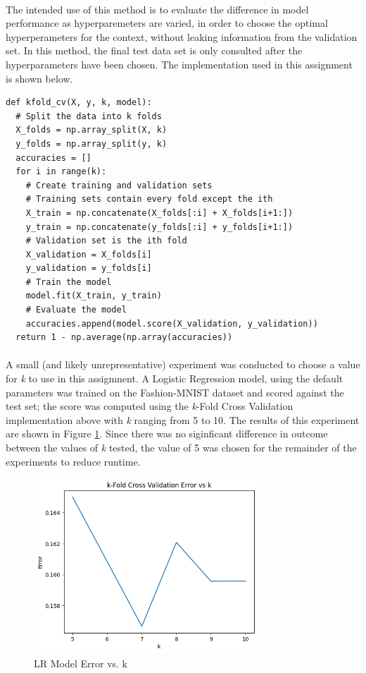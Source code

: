 \documentclass[12pt, letterpaper]{article}
\begin{document}
\paragraph*{}The intended use of this method is to evaluate the difference in
model performance as hyperparemeters are varied, in order to choose the optimal
hyperperameters for the context, without leaking information from the validation set.
In this method, the final test data set is only consulted after the hyperparameters
have been chosen. The implementation used in this assignment is shown below.

\begin{verbatim}
def kfold_cv(X, y, k, model):
  # Split the data into k folds
  X_folds = np.array_split(X, k)
  y_folds = np.array_split(y, k)
  accuracies = []
  for i in range(k):
    # Create training and validation sets
    # Training sets contain every fold except the ith
    X_train = np.concatenate(X_folds[:i] + X_folds[i+1:])
    y_train = np.concatenate(y_folds[:i] + y_folds[i+1:])
    # Validation set is the ith fold
    X_validation = X_folds[i]
    y_validation = y_folds[i]
    # Train the model
    model.fit(X_train, y_train)
    # Evaluate the model
    accuracies.append(model.score(X_validation, y_validation))
  return 1 - np.average(np.array(accuracies))
\end{verbatim}

\paragraph*{}A small (and likely unrepresentative) experiment was conducted
to choose a value for \textit{k} to use in this assigmnent. A Logistic Regression
model, using the default parameters was trained on the Fashion-MNIST dataset
and scored against the test set; the score was computed using the \textit{k}-Fold
Cross Validation implementation above with \textit{k} ranging from 5 to 10.
The results of this experiment are shown in Figure \ref{fig:3}. Since there was
no siginficant difference in outcome between the values of \textit{k} tested,
the value of 5 was chosen for the remainder of the experiments to reduce runtime.

\begin{figure}[ht]
    \centering
    \includegraphics[width=0.75\textwidth]{1.png}
    \caption{LR Model Error vs. k}
    \label{fig:3}
\end{figure}
\end{document}
